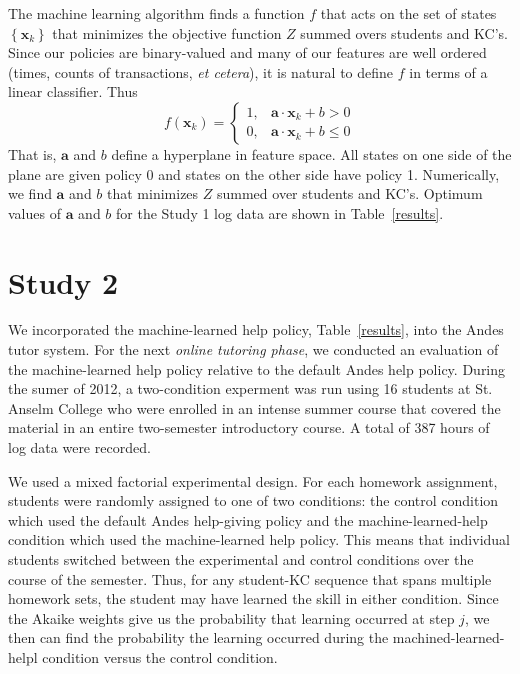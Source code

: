 \documentclass{edm_template}
\begin{document}
The machine learning algorithm finds a function $f$ that acts on
the set of states $\left\{\mathbf{x}_k\right\}$ that minimizes
the objective function $Z$ summed overs students and KC's.  
Since our policies are binary-valued
and many of our features are well ordered (times, counts of transactions,
{\em et cetera}), it is natural to define $f$ in terms of a 
linear classifier.  Thus
%
\begin{equation}
              f(\mathbf{x}_k) = \left\{\begin{array}{cc}
		1,& \mathbf{a}\cdot \mathbf{x}_k+b >0 \\
                0, & \mathbf{a}\cdot \mathbf{x}_k +b\le 0
		\end{array} \right. \label{classifier}
\end{equation}
%
That is, $\mathbf{a}$ and $b$ define a hyperplane in feature
space.  All states on one side of the plane are given policy 0
and states on the other side have policy 1.
Numerically, we find $\mathbf{a}$ and $b$ that minimizes $Z$
summed over students and KC's.
Optimum values of  $\mathbf{a}$ and $b$ for the  
Study 1 log data are shown in Table~\ref{results}.

\section{Study 2}

We incorporated the machine-learned help policy,
Table~\ref{results}, into the Andes tutor system.  For the next {\em
  online tutoring phase}, we conducted an evaluation of the
machine-learned help policy relative to the default Andes help policy.
During the sumer of 2012, a two-condition experment was run using 16
students at St. Anselm College who were enrolled in an intense summer
course that covered the material in an entire two-semester introductory course. 
A total of 387 hours of log data were recorded.

We used a mixed factorial experimental design.  For each homework assignment,
students were randomly assigned to one of two conditions:  the control
condition which used the default Andes help-giving policy and the
machine-learned-help condition which used the machine-learned help policy.
This means that individual students switched
between the experimental and control conditions over the course of the
semester.  Thus, for any student-KC sequence that spans multiple
homework sets, the student may have learned the skill in either 
condition.  Since the Akaike weights  give us the probability that 
learning occurred at step $j$, we then can find the probability 
the learning occurred
during the machined-learned-helpl condition versus the control condition.
\end{document}
